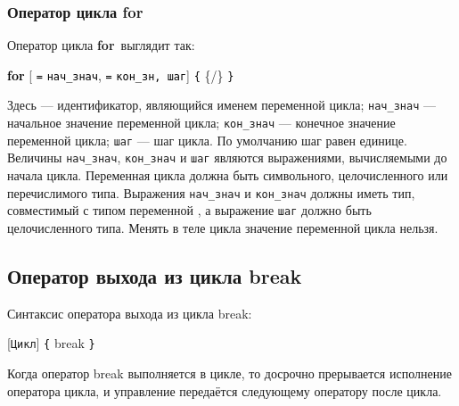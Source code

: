 \documentclass[10pt]{report}
\begin{document}
        \subsubsection{Оператор цикла for}
Оператор цикла \textbf{for}\ выглядит так:
\begin{center}
\textcolor{Black}{\textbf{for}}%
[ \textcolor{Black}{\texttt{=}} \textcolor{Black}{\texttt{нач_знач},  \textcolor{Black}{\texttt{=}} }\textcolor{Black}{\texttt{кон_зн}}\textcolor{Black}{\texttt{, шаг}}]%
\textcolor{Black}{\texttt{\{}} \{/\} \textcolor{Black}{\texttt{\} }}
\end{center}

Здесь \textcolor{Green}{} --- идентификатор, являющийся именем переменной цикла; \texttt{нач_знач} --- начальное значение переменной цикла;
\texttt{кон_знач} --- конечное значение переменной цикла; \texttt{шаг} --- шаг цикла. По умолчанию шаг равен единице. Величины \texttt{нач_знач}, \texttt{кон_знач} и
\texttt{шаг} являются выражениями, вычисляемыми до начала цикла. Переменная цикла должна быть символьного, целочисленного или перечислимого типа. Выражения \texttt{нач_знач} и
\texttt{кон_знач} должны иметь тип, совместимый с типом переменной \textcolor{Green}{}, а выражение \texttt{шаг} должно быть целочисленного типа.
Менять в теле цикла значение переменной цикла нельзя.


    \subsection{Оператор выхода из цикла break}

Синтаксис оператора выхода из цикла break:
\begin{center}
\textcolor{Black}[\texttt{Цикл}]%
\textcolor{Black}{\texttt{\{}} break \textcolor{Black}{\texttt{\} }}
\end{center}
Когда оператор break выполняется в цикле, то досрочно прерывается исполнение оператора цикла, и управление передаётся следующему оператору после цикла.
         
\end{document}
